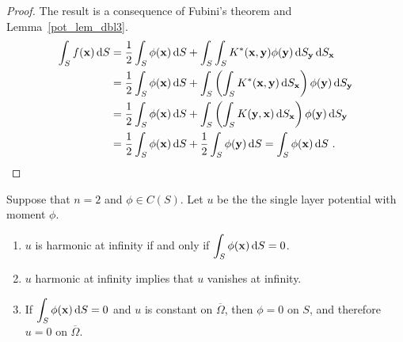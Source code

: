 \begin{proof}
The result is a consequence of Fubini's theorem and
Lemma~\ref{pot_lem_dbl3}.
\begin{align*}
\int_S f(\mathbf{x}) \,\mathrm{d}{S} &= \frac{1}{2} \int_S \phi(\mathbf{x}) \,\mathrm{d}{S} + 
\int_S \int_S K^\ast(\mathbf{x},\mathbf{y}) \phi(\mathbf{y}) \,\mathrm{d}{S}_{\mathbf{y}} \,\mathrm{d}{S}_{\mathbf{x}} \\
&= \frac{1}{2} \int_S \phi(\mathbf{x}) \,\mathrm{d}{S} + 
\int_S \left( \int_S K^\ast(\mathbf{x},\mathbf{y}) \,\mathrm{d}{S}_{\mathbf{x}} \right)
\phi(\mathbf{y}) \,\mathrm{d}{S}_{\mathbf{y}} \\
&= \frac{1}{2} \int_S \phi(\mathbf{x}) \,\mathrm{d}{S} + 
\int_S \left( \int_S K(\mathbf{y},\mathbf{x}) \,\mathrm{d}{S}_{\mathbf{x}} \right)
\phi(\mathbf{y}) \,\mathrm{d}{S}_{\mathbf{y}} \\
&= \frac{1}{2} \int_S \phi(\mathbf{x}) \,\mathrm{d}{S}
+ \frac{1}{2} \int_S \phi(\mathbf{y}) \,\mathrm{d}{S}
= \int_S \phi(\mathbf{x}) \,\mathrm{d}{S} \ . \qedhere
\end{align*}
\end{proof}

\begin{lemma} \label{pot_1to1n2}
Suppose that $n=2$ and $\phi \in C(S)$.  Let $u$ be the
the single layer potential with moment $\phi$.
\begin{enumerate}
\item $u$ is harmonic at infinity if and only if
$\displaystyle \int_{S} \phi(\mathbf{x}) \,\mathrm{d}{S} =0$.
\item $u$ harmonic at infinity implies that $u$ vanishes at infinity.
\item If $\displaystyle \int_{S} \phi(\mathbf{x}) \,\mathrm{d}{S} =0$
and $u$ is constant on $\overline{\Omega}$, then $\phi=0$ on
$S$, and therefore $u=0$ on $\overline{\Omega}$.
\end{enumerate}
\end{lemma}

